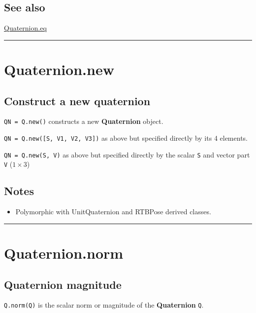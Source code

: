 \subsection*{See also}


\hyperlink{Quaternion.eq}{\color{blue} Quaternion.eq}

\vspace{1.5ex}\hrule

\hypertarget{Quaternion.new}{\section*{Quaternion.new}}
\subsection*{Construct a new quaternion}


\texttt{QN = Q.new()} constructs a new \textbf{\color{red} Quaternion} object.



\texttt{QN = Q.new([S, V1, V2, V3])} as above but specified directly by its 4 elements.



\texttt{QN = Q.new(S, V)} as above but specified directly by the scalar \texttt{S} and vector
part \texttt{V} ($1 \times 3$)


\subsection*{Notes}
\begin{itemize}
  \item Polymorphic with UnitQuaternion and RTBPose derived classes.
\end{itemize}
\vspace{1.5ex}\hrule

\hypertarget{Quaternion.norm}{\section*{Quaternion.norm}}
\subsection*{Quaternion magnitude}


\texttt{Q.norm(Q)} is the scalar norm or magnitude of the \textbf{\color{red} Quaternion} \texttt{Q}.


